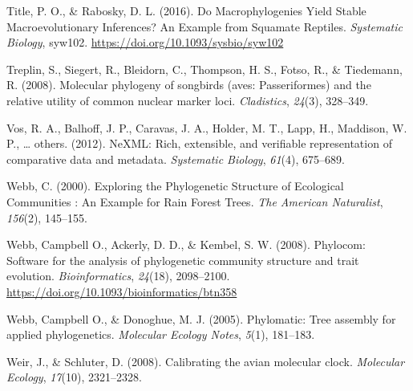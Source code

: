 \documentclass[
  man]{apa6}
\newlength{\cslhangindent}
\newlength{\cslentryspacingunit} %
\newenvironment{CSLReferences}[2] %
 {%
  \setlength{\parindent}{0pt}
  \ifodd #1
  \let\oldpar\par
  \def\par{\hangindent=\cslhangindent\oldpar}
  \fi
  \setlength{\parskip}{#2\cslentryspacingunit}
 }%
 {}
\begin{document}
\begin{CSLReferences}{1}{0}
\leavevmode{}%
Title, P. O., \& Rabosky, D. L. (2016). {Do Macrophylogenies Yield Stable Macroevolutionary Inferences? An Example from Squamate Reptiles}. \emph{Systematic Biology}, syw102. \url{https://doi.org/10.1093/sysbio/syw102}

\leavevmode{}%
Treplin, S., Siegert, R., Bleidorn, C., Thompson, H. S., Fotso, R., \& Tiedemann, R. (2008). Molecular phylogeny of songbirds (aves: Passeriformes) and the relative utility of common nuclear marker loci. \emph{Cladistics}, \emph{24}(3), 328--349.

\leavevmode{}%
Vos, R. A., Balhoff, J. P., Caravas, J. A., Holder, M. T., Lapp, H., Maddison, W. P., \ldots{} others. (2012). NeXML: Rich, extensible, and verifiable representation of comparative data and metadata. \emph{Systematic Biology}, \emph{61}(4), 675--689.

\leavevmode{}%
Webb, C. (2000). {Exploring the Phylogenetic Structure of Ecological Communities : An Example for Rain Forest Trees}. \emph{{The American Naturalist}}, \emph{156}(2), 145--155.

\leavevmode{}%
Webb, Campbell O., Ackerly, D. D., \& Kembel, S. W. (2008). {Phylocom: Software for the analysis of phylogenetic community structure and trait evolution}. \emph{Bioinformatics}, \emph{24}(18), 2098--2100. \url{https://doi.org/10.1093/bioinformatics/btn358}

\leavevmode{}%
Webb, Campbell O., \& Donoghue, M. J. (2005). Phylomatic: Tree assembly for applied phylogenetics. \emph{{Molecular Ecology Notes}}, \emph{5}(1), 181--183.

\leavevmode{}%
Weir, J., \& Schluter, D. (2008). Calibrating the avian molecular clock. \emph{Molecular Ecology}, \emph{17}(10), 2321--2328.

\end{CSLReferences}

\endgroup
\end{document}
